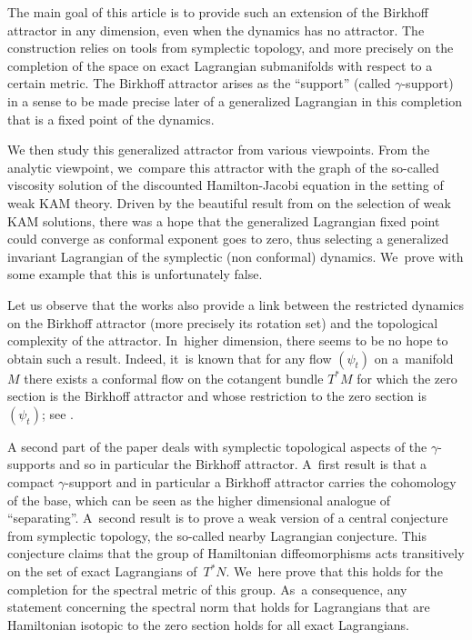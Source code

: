 \documentclass[10pt]{amsart}
\theoremstyle{definition}
\begin{document}
The main goal of this article is to provide such an extension of the Birkhoff attractor in any dimension, even when the dynamics has no attractor. The construction relies on tools from symplectic topology, and more precisely on the completion of the space on exact Lagrangian submanifolds with respect to a certain metric. The Birkhoff attractor arises as the ``support'' (called $\gamma$\nobreakdash-support) in a sense to be made precise later of a generalized Lagrangian in this completion that is a fixed point of the dynamics.

We then study this generalized attractor from various viewpoints.
From the analytic viewpoint, we~compare this attractor with the graph of the so-called viscosity solution of the discounted Hamilton-Jacobi equation in the setting of weak KAM theory. Driven by the beautiful result from \cite{DFIZ} on the selection of weak KAM solutions, there was a hope that the generalized Lagrangian fixed point could converge as conformal exponent goes to zero, thus selecting a generalized invariant Lagrangian of the symplectic (non conformal) dynamics. We~prove with some example that this is unfortunately false.

Let us observe that the works \cite{Birkhoff-attractor,Charpentier-1,Charpentier-2} also provide a link between the restricted dynamics on the Birkhoff attractor (more precisely its rotation set) and the topological complexity of the attractor. In~higher dimension, there seems to be no hope to obtain such a result. Indeed, it~is known that for any flow $(\psi_t)$ on a~manifold~$M$ there exists a conformal flow on the cotangent bundle $T^*M$ for which the zero section is the Birkhoff attractor and whose restriction to the zero section is~$(\psi_t)$; see \cite[\S 7.1]{Arnaud-Fejoz}.

A second part of the paper deals with symplectic topological aspects of the $\gamma$\nobreakdash-supports and so in particular the Birkhoff attractor. A~first result is that a compact $\gamma$\nobreakdash-support and in particular a Birkhoff attractor carries the cohomology of the base, which can be seen as the higher dimensional analogue of ``separating''. A~second result is to prove a weak version of a central conjecture from symplectic topology, the so-called nearby Lagrangian conjecture. This conjecture claims that the group of Hamiltonian diffeomorphisms acts transitively on the set of exact Lagrangians of~$T^*N$. We~here prove that this holds for the completion for the spectral metric of this group. As~a consequence, any statement concerning the spectral norm that holds for Lagrangians that are Hamiltonian isotopic to the zero section holds for all exact Lagrangians.
\end{document}
